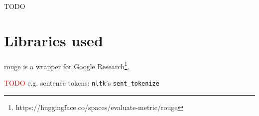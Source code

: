 TODO











\section{Libraries used}
\label{app:libraries}

\ac{rouge} is a wrapper for Google Research\footnote{https://huggingface.co/spaces/evaluate-metric/rouge}.


\textcolor{red}{TODO}
e.g. sentence tokens: \texttt{nltk}'s \texttt{sent\_tokenize}